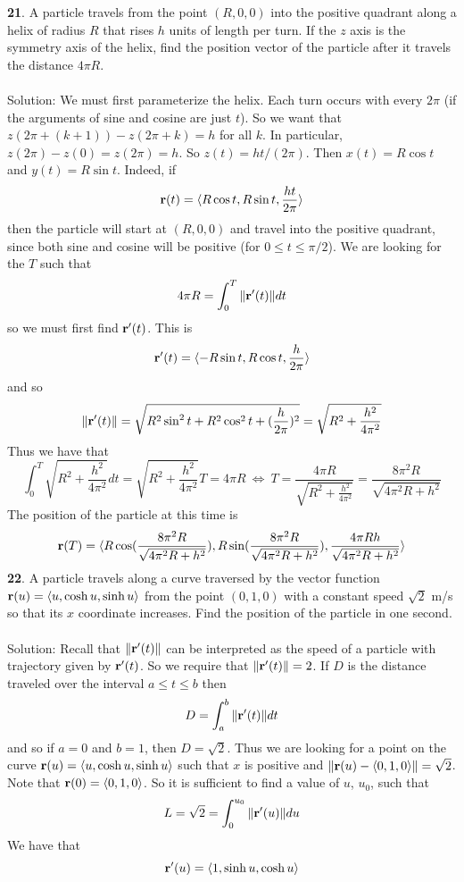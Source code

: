 \documentclass[12pt]{amsbook}
\newcommand{\la}{\langle}
\newcommand{\ra}{\rangle}
\begin{document}
{\small\bf 21}. A particle travels from the point $(R, 0, 0)$ into the positive quadrant
along a helix of radius $R$ that rises $h$ units of length per turn. If the $z$ axis is
the symmetry axis of the helix, find the position vector of the particle after
it travels the distance $4\pi R$.
\\
\\
{\sc Solution}: We must first parameterize the helix. Each turn occurs with every $2\pi$ (if the arguments of sine and cosine are just $t$). So we want that $z(2\pi+(k+1))-z(2\pi +k)=h$ for all $k$. In particular, $z(2\pi)-z(0)=z(2\pi)=h$. So $z(t)=ht/(2\pi)$. Then $x(t)=R\cos t$ and $y(t)=R\sin t$. Indeed, if 
$${\bf r}(t)=\la R\cos t, R\sin t, \frac{ht}{2\pi} \ra$$
then the particle will start at $(R,0,0)$ and travel into the positive quadrant, since both sine and cosine will be positive (for $0 \leq t \leq \pi/2$). We are looking for the $T$ such that
$$4\pi R=\int_0^T \|{\bf r}'(t)\| dt$$
so we must first find ${\bf r}'(t)$. This is
$${\bf r}'(t)=\la -R\sin t, R\cos t, \frac{h}{2\pi} \ra$$
and so
$$\|{\bf r}'(t)\|=\sqrt{R^2\sin^2 t+R^2\cos^2 t + (\frac{h}{2\pi})^2}=\sqrt{R^2+\frac{h^2}{4\pi^2}}$$
Thus we have that
$$\int_0^T\sqrt{R^2+\frac{h^2}{4\pi^2}}dt = \sqrt{R^2+\frac{h^2}{4\pi^2}}T = 4\pi R \ \Leftrightarrow \ T=\frac{4 \pi R}{\sqrt{R^2+\frac{h^2}{4\pi^2}}}=\frac{8\pi^2R}{\sqrt{4\pi^2 R+h^2}}$$
The position of the particle at this time is
$${\bf r}(T)=\la R\cos(\frac{8\pi^2R}{\sqrt{4\pi^2 R+h^2}}), R\sin(\frac{8\pi^2R}{\sqrt{4\pi^2 R+h^2}}),  \frac{4\pi R h}{\sqrt{4\pi^2 R+h^2}}\ra$$
{\small\bf 22}. A particle travels along a curve traversed by the vector function ${\bf r}(u) =
\la u, \cosh u, \sinh u\ra$ from the point $(0, 1, 0)$ with a constant speed $\sqrt{2}$ m/s so that its $x$ coordinate increases. Find the position of the particle in one second.
\\
\\
{\sc Solution}: Recall that $\|{\bf r}'(t)\|$ can be interpreted as the speed of a particle with trajectory given by ${\bf r}'(t)$. So we require that $\|{\bf r}'(t)\|=2$. If $D$ is the distance traveled over the interval $a \leq t \leq b$ then
$$D=\int_a^b\|{\bf r}'(t)\|dt$$
and so if $a=0$ and $b=1$, then $D=\sqrt{2}$. Thus we are looking for a point on the curve ${\bf r}(u)=\la u,\cosh u, \sinh u \ra$ such that $x$ is positive and $\|{\bf r}(u)-\la 0,1,0 \ra \|=\sqrt{2}$. Note that ${\bf r}(0)=\la 0,1,0 \ra$. So it is sufficient to find a value of $u$, $u_0$, such that
$$L=\sqrt{2}=\int_0^{u_0} \|{\bf r}'(u)\|du$$
We have that 
$${\bf r}'(u)=\la 1, \sinh u, \cosh u \ra$$
\end{document}
